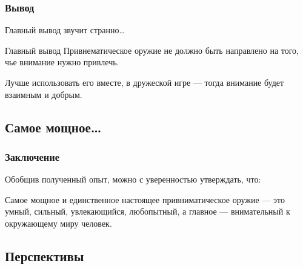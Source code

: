\begin{frame}
    \frametitle{Вывод}
    
    Главный вывод звучит странно\ldots 
    
    \begin{block}{Главный вывод}
        Привнематическое оружие \alert{не должно} быть направлено на того, чье внимание нужно привлечь. 
    \end{block}
    
    \par\bigskip
    
    Лучше использовать его вместе, в дружеской игре --- тогда внимание будет \alert{взаимным} и \alert{добрым}.
\end{frame}


\subsection{Самое мощное\ldots}

\begin{frame}
    \frametitle{Заключение}
    
    Обобщив полученный опыт, можно с уверенностью утверждать, что:
    
    \begin{block}{}
        Самое мощное и \alert{единственное настоящее} привниматическое оружие --- это умный, сильный, увлекающийся, любопытный, а главное --- \alert{внимательный к окружающему миру} человек.
    \end{block}
\end{frame}

    
\subsection{Перспективы}

